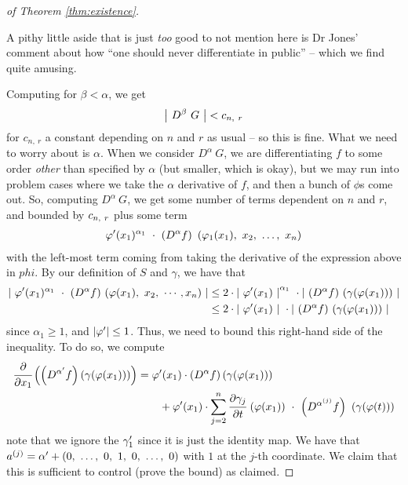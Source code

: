 \begin{proof}[of Theorem \ref{thm:existence}]
    \begin{svgraybox}
      A pithy little aside that is just \emph{too} good to not mention here is Dr Jones' comment about how ``one should never differentiate in public'' -- which we find quite amusing.
    \end{svgraybox}

    Computing for $\beta < \alpha$, we get
      \begin{align*}
        \left\vert \ D^{\beta} \ G \ \right\vert < c_{n, \ r}
      \end{align*}
    for $c_{n, \ r}$ a constant depending on $n$ and $r$ as usual -- so this is fine. What we need to worry about is $\alpha$. When we consider $D^{\alpha} \ G$, we are differentiating $f$ to some order \emph{other} than specified by $\alpha$ (but smaller, which is okay), but we may run into problem cases where we take the $\alpha$ derivative of $f$, and then a bunch of $\phi$s come out. So, computing $D^{\alpha} \ G$, we get some number of terms dependent on $n$ and $r$, and bounded by $c_{n, \ r}$ plus some term
      \begin{align*}
        \varphi^{\prime}(x_1)^{\alpha_1} \ \cdot \ \left( D^{\alpha} f \right) \ (\varphi_1(x_1), \ x_2, \ \hdots, \ x_n)
      \end{align*}
    with the left-most term coming from taking the derivative of the expression above in $phi$. By our definition of $S$ and $\gamma$, we have that
      \begin{align*}
        \left\vert \  \pri{\phi}(x_1)^{\alpha_1} \ \cdot \ (D^{\alpha} f) \ (\phi(x_1), \ x_2, \ \cdots, x_n) \ \right\vert &\leq 2 \cdot \left\vert \ \pri{\phi}(x_1) \ \right\vert^{\alpha_1} \ \cdot \left\vert \ (D^{\alpha} f) \ (\gamma(\phi(x_1))) \ \right\vert \\
                    &\leq 2 \cdot \left\vert \ \pri{\phi}(x_1) \ \right\vert \ \cdot \left\vert \ (D^{\alpha} f) \ (\gamma(\phi(x_1))) \ \right\vert
      \end{align*}
    since $\alpha_1 \geq 1$, and $\vert\varphi^{\prime}\vert \leq 1$. Thus, we need to bound this right-hand side of the inequality. To do so, we compute
      \begin{align}
        \cfrac{\partial}{\partial x_1} \left( \left( D^{\alpha^{\prime}} f \right) \left( \gamma (\varphi(x_1)) \right) \right) &= \varphi^{\prime}(x_1) \cdot \left( D^{\alpha} f \right) \left( \gamma (\varphi(x_1)) \right) \label{eqn:param_deriv_1} \\
        &\quad \quad+ \varphi^{\prime}(x_1) \cdot \sum_{j=2}^{n} \cfrac{\partial \gamma_j}{\partial t} \ (\varphi(x_1)) \ \cdot \ \left( D^{{\alpha}^{(j)}} f \right) \ \left( \gamma(\varphi(t)) \right)
        \label{eqn:param_deriv_2}
      \end{align}
    note that we ignore the $\gamma_1^{\prime}$ since it is just the identity map. We have that $a^{(j)} = \alpha^{\prime} + (0, \ \hdots, \ 0, \ 1, \ 0, \ \hdots, \ 0)$ with $1$ at the $j$-th coordinate. We claim that this is sufficient to control (prove the bound) as claimed.


\end{proof}
